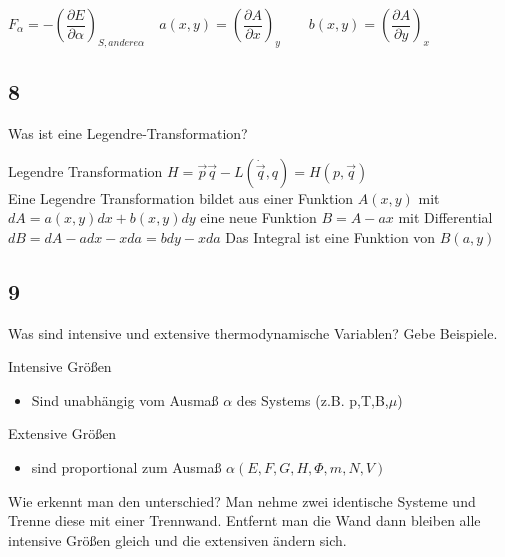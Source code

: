 $ F_\alpha = - \left( \dfrac{\partial E}{\partial \alpha }\right) _{S,andere \alpha} \quad a(x,y)= \left( \dfrac{\partial A}{\partial x}\right) _y \qquad b(x,y) = \left( \dfrac{\partial A}{\partial y }\right) _x$
\subsection{8}
\begin{myfrag}
Was ist eine Legendre-Transformation?
\end{myfrag}
Legendre Transformation $H= \vec{p}\vec{q}-L(\dot{\vec{q}},q)=H(p,\vec{q} )$ \\
Eine Legendre Transformation bildet aus einer Funktion $A(x,y)$ mit $ dA= a(x,y)dx +b(x,y)dy$ eine neue Funktion $B=A-ax$ mit Differential $ dB = dA - adx -xda = bdy -xda$ Das Integral ist eine Funktion von $B(a,y)$
\subsection{9}
\begin{myfrag}
Was sind intensive und extensive thermodynamische Variablen? Gebe
Beispiele.
\end{myfrag} \quad \newline
Intensive Größen 
\begin{itemize}
\item Sind unabhängig vom Ausmaß $\alpha $ des Systems (z.B. p,T,B,$\mu $)
\end{itemize}
Extensive Größen
\begin{itemize}
\item sind proportional zum Ausmaß $\alpha (E,F,G,H, \Phi , m, N, V)$
\end{itemize}
Wie erkennt man den unterschied? Man nehme zwei identische Systeme und Trenne diese mit einer Trennwand. Entfernt man die Wand dann bleiben alle intensive Größen gleich und die extensiven ändern sich.